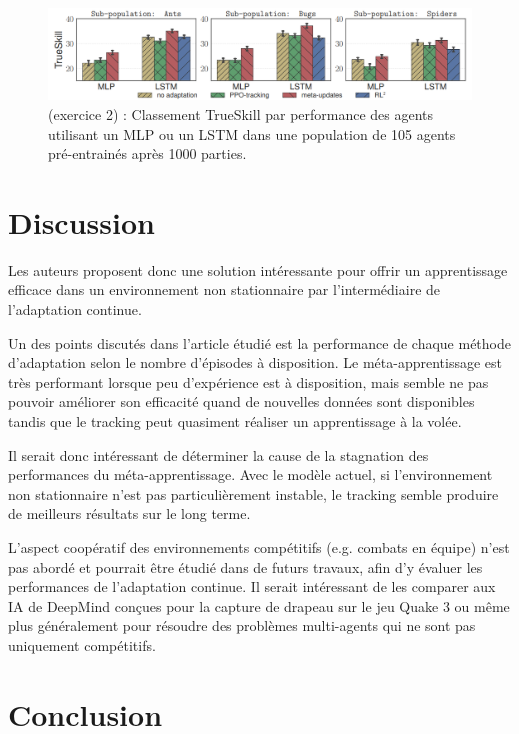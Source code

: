 \documentclass[a4paper,11pt]{article}
\begin{document}
    \begin{figure}[h]
      \centering
      \includegraphics[width=\textwidth]{fig3.png}
      \caption{(exercice 2) : Classement TrueSkill par performance des agents utilisant un MLP ou un LSTM dans une population de 105 agents pré-entrainés après 1000 parties.}
      \label{ex2}
    \end{figure}

    \section{Discussion}

    Les auteurs proposent donc une solution intéressante pour offrir un apprentissage efficace 
    dans un environnement non stationnaire par l'intermédiaire de l'adaptation continue.

    Un des points discutés dans l'article étudié est la performance de chaque méthode d'adaptation 
    selon le nombre d'épisodes à disposition. Le méta-apprentissage est très performant lorsque peu 
    d'expérience est à disposition, mais semble ne pas pouvoir améliorer son efficacité quand de nouvelles 
    données sont disponibles tandis que le tracking peut quasiment réaliser un apprentissage à la volée.
    
    Il serait donc intéressant de déterminer la cause de la stagnation des performances du méta-apprentissage.
    Avec le modèle actuel, si l'environnement non stationnaire n'est pas particulièrement instable, 
    le tracking\cite{sutton} semble produire de meilleurs résultats sur le long terme.

    L'aspect coopératif des environnements compétitifs (e.g. combats en équipe) n'est pas abordé et 
    pourrait être étudié dans de futurs travaux, afin d'y évaluer les performances de l'adaptation 
    continue. Il serait intéressant de les comparer aux IA de DeepMind conçues pour la capture de drapeau sur 
    le jeu Quake 3\cite{jaderberg} ou même plus généralement pour résoudre des problèmes multi-agents qui ne 
    sont pas uniquement compétitifs\cite{raluca}.

    \section{Conclusion}
\end{document}
